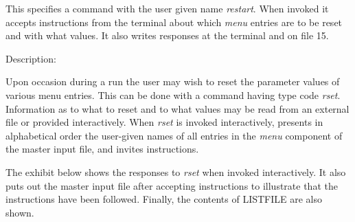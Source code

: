 This specifies a command with the user given name {\em restart}.  When invoked it accepts instructions from the terminal about which {\em menu} entries are to be reset and with what values.  It also writes responses at the terminal and on file 15.

\vspace{5mm}
     Description:
\vspace{2mm}

Upon occasion during a \Mary run the user may wish to reset the parameter values of various menu entries.  This can be done with a command having type code {\em rset}.  Information as to what to reset and to what values may be read from an external file or provided interactively.  When {\em rset} is invoked interactively, \Mary presents in alphabetical order the user-given names of all entries in the {\em menu} component of the master input file, and invites instructions.

The exhibit below shows the \Mary responses to {\em rset} when invoked interactively.  It also puts out the master input file after accepting instructions to illustrate that the instructions have been followed.  Finally, the contents of LISTFILE are also shown.

